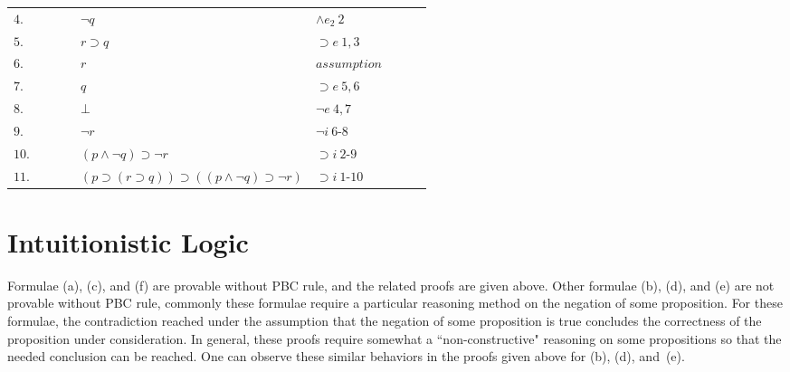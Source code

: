 \documentclass[12pt]{article}
\begin{document}
\begin{itemize}
\begin{table}[H]
\begin{tabular}{*9{l}}
			$4.$ & \multicolumn{1}{|c}{} & \multicolumn{1}{|c}{} & & $\neg q$ & $\land e_2 \ 2$ & & \multicolumn{1}{c|}{} &\multicolumn{1}{c|}{}\\
			
			$5.$ & \multicolumn{1}{|c}{} & \multicolumn{1}{|c}{} & & $r \supset q$ & $\supset e \ 1, 3$ & & \multicolumn{1}{c|}{} &\multicolumn{1}{c|}{}\\
			
			\cline{4-6}
			
			$6.$ & \multicolumn{1}{|c}{} & \multicolumn{1}{|c}{} & \multicolumn{1}{|c}{} & $r$ & $assumption$ & \multicolumn{1}{|c}{} & \multicolumn{1}{c|}{} &\multicolumn{1}{c|}{}\\
			
			$7.$ & \multicolumn{1}{|c}{} & \multicolumn{1}{|c}{} & \multicolumn{1}{|c}{} & $q$ & $\supset e \ 5, 6$ & \multicolumn{1}{|c}{} & \multicolumn{1}{c|}{} &\multicolumn{1}{c|}{}\\
			
			$8.$ & \multicolumn{1}{|c}{} & \multicolumn{1}{|c}{} & \multicolumn{1}{|c}{} & $\bot$ & $\neg e \ 4, 7$ & \multicolumn{1}{|c}{} & \multicolumn{1}{c|}{} & \multicolumn{1}{c|}{}\\
			
			\cline{4-6}
			
			$9.$ & \multicolumn{1}{|c}{} & \multicolumn{1}{|c}{} & & $\neg r$ & $\neg i \ 6$-$8$ & & \multicolumn{1}{c|}{} & \multicolumn{1}{c|}{}\\
			
			\cline{3-8}
			
			$10.$ & \multicolumn{1}{|c}{} & & & $(p \land \neg q) \supset \neg r$ & $\supset i \ 2$-$9$ & & & \multicolumn{1}{c|}{}\\
			
			\cline{2-9}
			
			$11.$ & & & & $(p \supset (r \supset q)) \supset ((p \land \neg q) \supset \neg r)$ & $\supset i \ 1$-$10$ & & & \\
			
			
		
		\end{tabular}
		\end{table}
		
\end{itemize}


\section{Intuitionistic Logic}

Formulae (a), (c), and (f) are provable without PBC rule, and the related proofs are given above. Other formulae (b), (d), and (e) are not provable without PBC rule, commonly these formulae require a particular reasoning method on the negation of some proposition. For these formulae, the contradiction reached under the assumption that the negation of some proposition is true concludes the correctness of the proposition under consideration. In general, these proofs require somewhat a ``non-constructive" reasoning on some propositions so that the needed conclusion can be reached. One can observe these similar behaviors in the proofs given above for (b), (d), and~(e).
\end{document}
